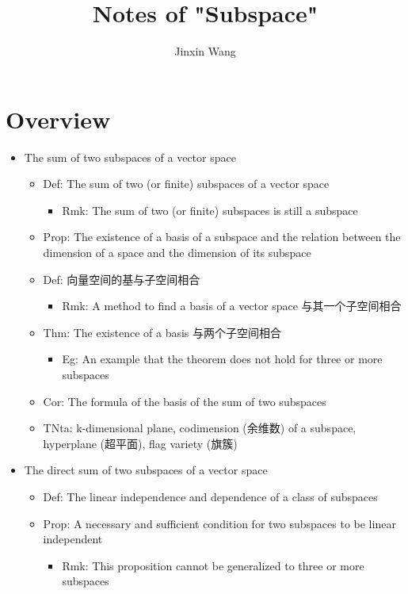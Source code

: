 \documentclass[onecolumn]{ctexart}
\title{Notes of "Subspace"}
\author{Jinxin Wang}
\date{}
\begin{document}
\maketitle

\section{Overview}
\begin{itemize}
  \item The sum of two subspaces of a vector space
  \begin{itemize}
    \item Def: The sum of two (or finite) subspaces of a vector space
    \begin{itemize}
      \item Rmk: The sum of two (or finite) subspaces is still a subspace
    \end{itemize}
    \item Prop: The existence of a basis of a subspace and the relation between the dimension of a space and the dimension of its subspace
    \item Def: 向量空间的基与子空间相合
    \begin{itemize}
      \item Rmk: A method to find a basis of a vector space 与其一个子空间相合
    \end{itemize}
    \item Thm: The existence of a basis 与两个子空间相合
    \begin{itemize}
      \item Eg: An example that the theorem does not hold for three or more subspaces
    \end{itemize}
    \item Cor: The formula of the basis of the sum of two subspaces
    \item TNta: k-dimensional plane, codimension (余维数) of a subspace, hyperplane (超平面), flag variety (旗簇)
  \end{itemize}
  \item The direct sum of two subspaces of a vector space
  \begin{itemize}
    \item Def: The linear independence and dependence of a class of subspaces
    \item Prop: A necessary and sufficient condition for two subspaces to be linear independent
    \begin{itemize}
      \item Rmk: This proposition cannot be generalized to three or more subspaces

\end{itemize}
\end{itemize}
\end{itemize}
\end{document}
